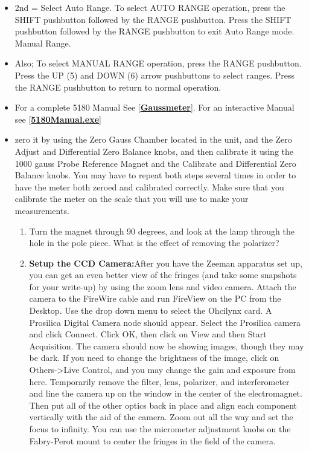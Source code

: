 \documentclass{../lab}
\begin{document}
\begin{enumerate}
\begin{itemize}
\begin{itemize}
            \item 2nd = Select Auto Range. To select AUTO RANGE operation, press the SHIFT pushbutton followed by the RANGE pushbutton. Press the SHIFT pushbutton followed by the RANGE pushbutton to exit Auto Range mode. Manual Range.
            
            \item Also; To select MANUAL RANGE operation, press the RANGE pushbutton. Press the UP (5) and DOWN (6) arrow pushbuttons to select ranges. Press the RANGE pushbutton to return to normal operation.
            
            \item For a complete 5180 Manual See [\href{http://physics111.lib.berkeley.edu/Physics111/Equipment\_Manuals/Gaussmeter5180.pdf}{\textbf{Gaussmeter}}]. For an interactive Manual see [\href{http://physics111.lib.berkeley.edu/Physics111/Reprints/HAL/5180Manual.exe}{\textbf{5180Manual.exe}}]
            
            \item zero it by using the Zero Gauss Chamber located in the unit, and the Zero Adjust and Differential Zero Balance knobs, and then calibrate it using the 1000 gauss Probe Reference Magnet and the Calibrate and Differential Zero Balance knobs. You may have to repeat both steps several times in order to have the meter both zeroed and calibrated correctly. Make sure that you calibrate the meter on the scale that you will use to make your measurements.
            \begin{enumerate}
                \item Turn the magnet through 90 degrees, and look at the lamp through the hole in the pole piece. What is the effect of removing the polarizer?
            
                \item \textbf{Setup the CCD Camera:}After you have the Zeeman apparatus set up, you can get an even better view of the fringes (and take some snapshots for your write-up) by using the zoom lens and video camera. Attach the camera to the FireWire cable and run FireView on the PC from the Desktop. Use the drop down menu to select the Ohcilynx card. A Prosilica Digital Camera node should appear. Select the Prosilica camera and click Connect. Click OK, then click on View and then Start Acquisition. The camera should now be showing images, though they may be dark. If you need to change the brightness of the image, click on Others->Live Control, and you may change the gain and exposure from here. Temporarily remove the filter, lens, polarizer, and interferometer and line the camera up on the window in the center of the electromagnet. Then put all of the other optics back in place and align each component vertically with the aid of the camera. Zoom out all the way and set the focus to infinity. You can use the micrometer adjustment knobs on the Fabry-Perot mount to center the fringes in the field of the camera.
            

\end{enumerate}
\end{itemize}
\end{itemize}
\end{enumerate}
\end{document}
